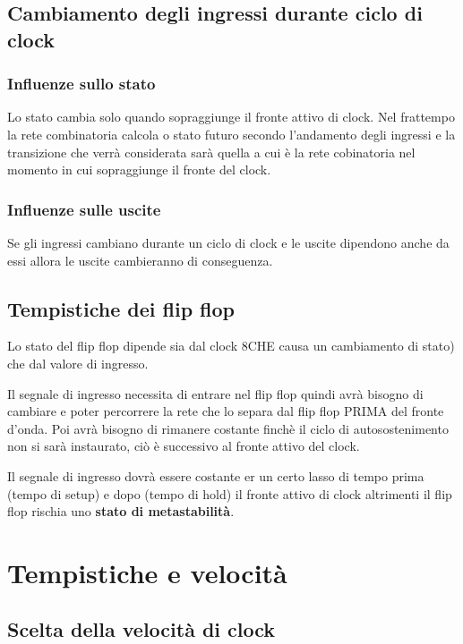 \documentclass[a4paper]{book}
\begin{document}
\subsection*{Cambiamento degli ingressi durante ciclo di clock}

\subsubsection{Influenze sullo stato}
Lo stato cambia solo quando sopraggiunge il fronte attivo di clock.
Nel frattempo la rete combinatoria calcola o stato futuro secondo l'andamento degli ingressi e la transizione che verrà considerata sarà quella a cui è la rete cobinatoria nel momento in cui sopraggiunge il fronte del clock.

\subsubsection{Influenze sulle uscite}

Se gli ingressi cambiano durante un ciclo di clock e le uscite dipendono anche da essi allora le uscite cambieranno di conseguenza.

\subsection{Tempistiche dei flip flop}

Lo stato del flip flop dipende sia dal clock 8CHE causa un cambiamento di stato) che dal valore di ingresso.

Il segnale di ingresso necessita di entrare nel flip flop quindi avrà bisogno di cambiare e poter percorrere la rete che lo separa dal flip flop PRIMA del fronte d'onda.
Poi avrà bisogno di rimanere costante finchè il ciclo di autosostenimento non si sarà instaurato, ciò è successivo al fronte attivo del clock.


Il segnale di ingresso dovrà essere costante er un certo lasso di tempo prima (tempo di setup) e dopo (tempo di hold) il fronte attivo di clock altrimenti il flip flop rischia uno \textbf{stato di metastabilità}.


\section{Tempistiche e velocità}
\subsection*{Scelta della velocità di clock}
\end{document}
